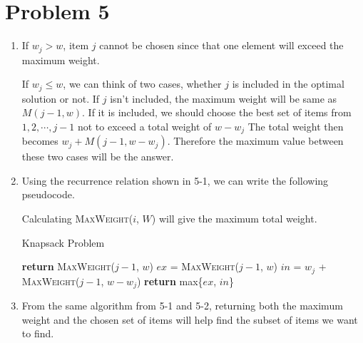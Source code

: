 \documentclass[10pt]{article}
\begin{document}
\section*{Problem 5}
\begin{enumerate}[leftmargin=*]
    \item If $w_j > w$, item $j$ cannot be chosen since that one element will exceed the maximum weight.
    
    \vspace{1mm}
    If $w_j \leq w$, we can think of two cases, whether $j$ is included in the optimal solution or not.
    If $j$ isn't included, the maximum weight will be same as $M(j-1, w)$.
    If it is included, we should choose the best set of items from $1, 2, \cdots , j-1$ not to exceed a total weight of $w - w_j$
    The total weight then becomes $w_j + M(j-1, w-w_j)$.
    Therefore the maximum value between these two cases will be the answer.

    \item Using the recurrence relation shown in 5-1, we can write the following pseudocode.
    
    \vspace{1mm}
    Calculating \textsc{MaxWeight}($i$, $W$) will give the maximum total weight.
    \begin{algorithm}[H]
        \caption{Knapsack Problem}\label{alg:knapsack_weightonly}
        \begin{algorithmic}
                \State \textbf{return} \textsc{MaxWeight}($j-1$, $w$)
            \Else
                \State $ex$ = \textsc{MaxWeight}($j-1$, $w$)
                \State $in$ = $w_j$ + \textsc{MaxWeight}($j-1$, $w-w_j$)
                \State \textbf{return} max\{$ex$, $in$\}
            \EndIf
            \EndFunction
        \end{algorithmic}
    \end{algorithm}

    \item From the same algorithm from 5-1 and 5-2, returning both the maximum weight and the chosen set of items will help find the subset of items we want to find.
    

\end{enumerate}
\end{document}
